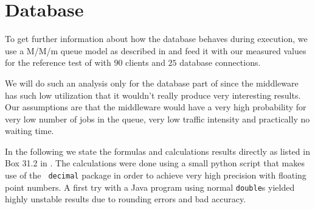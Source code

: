 \documentclass[a4paper, oneside]{csthesis}
\begin{document}
     \begin{table}[ht]
        \centering
        
        \begin{adjustbox}{center}
        \end{adjustbox}
        \caption{Utilization of the load centers in the MVA simulation}
        \label{tbl:utilization}
    \end{table}
    
    
    

\section{Database}
    To get further information about how the database behaves during execution,
    we use a M/M/m queue model as described in \cite{jain2008art} and feed it
    with our measured values for the reference test of \telesto{} with $90$
    clients and $25$ database connections.
    
    We will do such an analysis only for the database part of \telesto{} since
    the middleware has such low utilization that it wouldn't really produce very
    interesting results. Our assumptions are that the middleware would have a
    very high probability for very low number of jobs in the queue, very low
    traffic intensity and practically no waiting time.

    In the following we state the formulas and calculations results directly as
    listed in Box 31.2 in \cite{jain2008art}. The calculations were done
    using a small python script that makes use of the {\tt
    decimal} package in order to achieve very high precision with floating point numbers. A first try with a Java program using normal {\tt double}s yielded highly unstable results due to rounding errors and bad accuracy.
\end{document}
